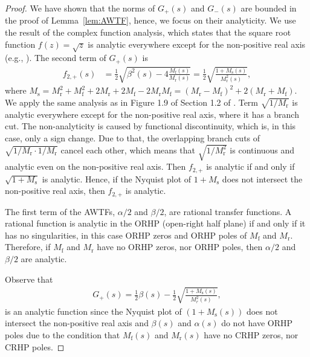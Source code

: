 \documentclass[10pt,twocolumn,twoside]{IEEEtran}
\theoremstyle{definition}
\begin{document}
\begin{proof}
We have shown that the norms of $G_+(s)$ and $G_-(s)$ are bounded in the proof of Lemma~\ref{lem:AWTF}, hence, we focus on their analyticity. We use the result of the complex function analysis, which states that the square root function $f(z)= \sqrt{z}$ is analytic everywhere except for the non-positive real axis (e.g., \cite{stein2010complex}). The second term of $G_+(s)$ is
\begin{align}
f_{2,+}(s) &=  \frac{1}{2}\sqrt{\beta^2(s) - 4\frac{M_{\text{f}}(s)}{M_\text{r}(s)}} = \frac{1}{2}\sqrt{\frac{1+M_{\text{s}}(s)}{M_{\text{r}}^2(s)}},\label{eq:pf_stab4}
\end{align}
where $M_{\text{s}} = M_{\text{r}}^2+M_{\text{f}}^2 + 2M_{\text{r}} + 2M_{\text{f}} - 2M_{\text{r}}M_{\text{f}} = (M_{\text{r}}-M_{\text{f}})^2+2(M_{\text{r}}+M_{\text{f}})$. We apply the same analysis as in Figure 1.9 of Section 1.2 of \cite{Kelly2006}. Term $\sqrt{1/M_{\text{r}}}$ is analytic everywhere except for the non-positive real axis, where it has a branch cut. The non-analyticity is caused by functional discontinuity, which is, in this case, only a sign change. Due to that, the overlapping branch cuts of $\sqrt{1/M_{\text{r}}\cdot 1/M_{\text{r}}}$ cancel each other, which means that $\sqrt{1/M_{\text{r}}^2}$ is continuous and analytic even on the non-positive real axis. Then $f_{2,+}$ is analytic if and only if $\sqrt{1+M_{\text{s}}}$ is analytic. Hence, if the Nyquist plot of $1+M_{\text{s}}$ does not intersect the non-positive real axis, then $f_{2,+}$ is analytic.

The first term of the AWTFs, $\alpha/2$ and $\beta/2$, are rational transfer functions. A rational function is analytic in the ORHP (open-right half plane) if and only if it has no singularities, in this case ORHP zeros and ORHP poles of $M_{\text{f}}$ and $M_{\text{r}}$. Therefore, if $M_{\text{f}}$ and $M_{\text{r}}$ have no ORHP zeros, nor ORHP poles, then $\alpha/2$ and $\beta/2$ are analytic.

Observe that
\begin{align}
  G_+(s) = \frac{1}{2}\beta(s)-\frac{1}{2}\sqrt{\frac{1+M_{\text{s}}(s)}{M_r^2(s)}},
\end{align}
is an analytic function since the Nyquist plot of $(1+M_{\text{s}}(s))$ does not intersect the non-positive real axis and $\beta(s)$ and $\alpha(s)$ do not have ORHP poles due to the condition that $M_{\text{f}}(s)$ and $M_{\text{r}}(s)$ have no CRHP zeros, nor CRHP poles.


\end{proof}
\end{document}
